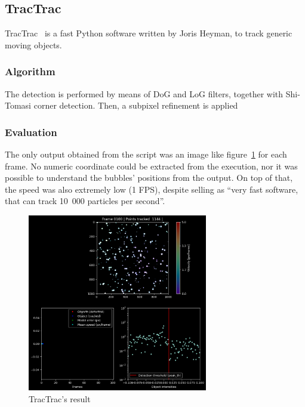 \subsection{TracTrac}
\label{sec:locate:tractrac}

TracTrac~\cite{tractrac} is a fast Python software written by Joris Heyman, to track generic moving objects.

\subsubsection{Algorithm}

The detection is performed by means of DoG and LoG filters, together with Shi-Tomasi corner detection.
Then, a subpixel refinement is applied

\subsubsection{Evaluation}

The only output obtained from the script was an image like figure~\ref{fig:locate:tractrac} for each frame.
No numeric coordinate could be extracted from the execution, nor it was possible to understand the bubbles' positions from the output.
On top of that, the speed was also extremely low (1 FPS), despite selling as ``very fast software, that can track 10~000 particles per second''.

\begin{figure}
	\centerline{\includegraphics[width=0.7\textwidth]{images/locate/tractrac.png}}
	\caption{\centering TracTrac's result}
	\label{fig:locate:tractrac}
\end{figure}
